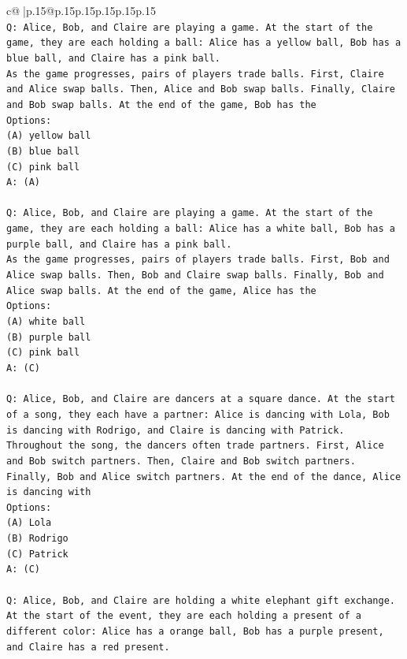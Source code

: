 \documentclass{article}
\begin{document}
{\begin{supertabular}{c@{$\;$}|p{.15\linewidth}@{}p{.15\linewidth}p{.15\linewidth}p{.15\linewidth}p{.15\linewidth}p{.15\linewidth}}
{{{\\ 
\texttt{Q: Alice, Bob, and Claire are playing a game. At the start of the game, they are each holding a ball: Alice has a yellow ball, Bob has a blue ball, and Claire has a pink ball.} \\
\texttt{As the game progresses, pairs of players trade balls. First, Claire and Alice swap balls. Then, Alice and Bob swap balls. Finally, Claire and Bob swap balls. At the end of the game, Bob has the} \\
\texttt{Options:} \\
\texttt{(A) yellow ball} \\
\texttt{(B) blue ball} \\
\texttt{(C) pink ball} \\
\texttt{A: (A)} \\
\\ 
\texttt{Q: Alice, Bob, and Claire are playing a game. At the start of the game, they are each holding a ball: Alice has a white ball, Bob has a purple ball, and Claire has a pink ball.} \\
\texttt{As the game progresses, pairs of players trade balls. First, Bob and Alice swap balls. Then, Bob and Claire swap balls. Finally, Bob and Alice swap balls. At the end of the game, Alice has the} \\
\texttt{Options:} \\
\texttt{(A) white ball} \\
\texttt{(B) purple ball} \\
\texttt{(C) pink ball} \\
\texttt{A: (C)} \\
\\ 
\texttt{Q: Alice, Bob, and Claire are dancers at a square dance. At the start of a song, they each have a partner: Alice is dancing with Lola, Bob is dancing with Rodrigo, and Claire is dancing with Patrick.} \\
\texttt{Throughout the song, the dancers often trade partners. First, Alice and Bob switch partners. Then, Claire and Bob switch partners. Finally, Bob and Alice switch partners. At the end of the dance, Alice is dancing with} \\
\texttt{Options:} \\
\texttt{(A) Lola} \\
\texttt{(B) Rodrigo} \\
\texttt{(C) Patrick} \\
\texttt{A: (C)} \\
\\ 
\texttt{Q: Alice, Bob, and Claire are holding a white elephant gift exchange. At the start of the event, they are each holding a present of a different color: Alice has a orange ball, Bob has a purple present, and Claire has a red present.} \\
}}}
\end{supertabular}}
\end{document}
